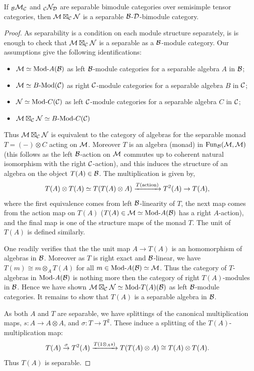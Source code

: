 \documentclass{amsart}
\begin{document}
\begin{theorem} \label{thm:compositeOfSep}
	If ${}_\mathcal B\mathcal M_\mathcal C$ and ${}_\mathcal C\mathcal N_\mathcal D$ are separable bimodule categories over semisimple tensor categories, then $\mathcal M \boxtimes_{\mathcal C} \mathcal N$ is a separable $\mathcal B$-$\mathcal D$-bimodule category.
\end{theorem}

\begin{proof}
	As separability is a condition on each module structure separately, is is enough to check that $\mathcal M \boxtimes_{\mathcal C} \mathcal N$ is a separable as a $\mathcal B$-module category. Our assumptions give the following identifications:
\begin{itemize}
	\item $\cM \simeq \Mod{}{A}(\cB)$ as left $\mathcal B$-module categories for a separable algebra $A$ in $\mathcal B$;
	\item $\cM \simeq \Mod{B}{}(\cC)$ as right $\mathcal C$-module categories for a separable algebra $B$ in $\mathcal C$;
	\item $\cN \simeq \Mod{}{C}(\cC)$ as left $\mathcal C$-module categories for a separable algebra $C$ in $\mathcal C$;
	\item $\cM \boxtimes_{\cC} \cN \simeq \Mod{B}{C}(\cC)$
\end{itemize}
Thus $\mathcal M \boxtimes_{\mathcal C} \mathcal N$ is equivalent to the category of algebras for the separable monad $T = (-) \otimes C$ acting on $\mathcal M$. Moreover $T$ is an algebra (monad) in $\operatorname{Fun}_{\mathcal B}(\mathcal M, \mathcal M)$ (this follows as the left $\mathcal B$-action on $\mathcal M$ commutes up to coherent natural isomorphism with the right $\mathcal C$-action), and this induces the structure of an algebra on the object $T(A) \in \mathcal B$. The multiplication is given by,
\begin{equation*}
	T(A) \otimes T(A)  \simeq T( T(A) \otimes A)  \xrightarrow{T(\textrm{action})} T^2(A) \to T(A),
\end{equation*}
where the first equivalence comes from left $\mathcal B$-linearity of $T$, the next map comes from the action map on $T(A)$ ($T(A) \in \cM \simeq \Mod{}{A}(\cB)$ has a right $A$-action), and the final map is one of the structure maps of the monad $T$. The unit of $T(A)$ is defined similarly. 

One readily verifies that the the unit map $A \to T(A)$ is an homomorphism of algebras in $\mathcal B$. Moreover as $T$ is right exact and $\mathcal B$-linear, we have $T(m) \cong m \otimes_A T(A)$ for all $m \in \Mod{}{A}(\cB) \simeq \cM$. Thus the category of $T$-algebras in $\Mod{}{A}(\cB)$ is nothing more then the category of right $T(A)$-modules in $\mathcal B$.  Hence we have shown $\cM \boxtimes_{\cC} \cN \simeq \Mod{}{T(A)}(\cB)$ as left $\mathcal B$-module categories. It remains to show that $T(A)$ is a separable algebra in $\mathcal B$.

As both $A$ and $T$ are separable, we have splittings of the canonical multiplication maps, $s: A  \to A \otimes A$, and $\sigma:T \to T^2$. These induce a splitting of the $T(A)$-multiplication map:
\begin{equation*}
	T(A) \stackrel{\sigma}{\to} T^2(A) \xrightarrow{T(1 \otimes_A s)} T( T(A) \otimes A) \cong T(A) \otimes T(A).
\end{equation*}
Thus $T(A)$ is separable.
\end{proof}
\end{document}
